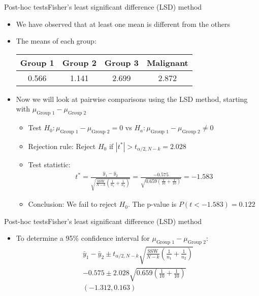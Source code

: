 \documentclass[xcolor=dvipsnames]{beamer}
\begin{document}
\begin{frame}{Post-hoc tests}{Fisher's least significant difference (LSD) method}
	\begin{itemize}
		\item We have observed that at least one mean is different from the others
		\item The means of each group:
		\begin{center}
			\begin{tabular}{|c|c|c|c|}
				\hline 
				  Group 1 & Group 2 & Group 3 & Malignant \\ \hline \hline
				 0.566 & 1.141 & 2.699 &  2.872 \\ \hline
			\end{tabular}
		\end{center}
	\vspace{2mm}
		\item Now we will look at pairwise comparisons using the LSD method, starting with $\mu_{\text{Group 1}}-\mu_{\text{Group 2}}$
		\begin{itemize}
			\item Test $H_0: \mu_{\text{Group 1}}-\mu_{\text{Group 2}} =0$ vs $H_a: \mu_{\text{Group 1}}-\mu_{\text{Group 2}}\neq 0$
			\item Rejection rule: Reject $H_0$ if $|t^*| > t_{\alpha/2, N-k} = 2.028$
					\item Test statistic:
			\begin{gather*}
			t^* = \frac{\bar{y}_1 - \bar{y}_2}{\sqrt{\frac{\text{SSW}}{N-k} \left(\frac{1}{n_1}+\frac{1}{n_2}\right)}} = 
			\frac{-0.575}{\sqrt{0.659 \left(\frac{1}{10}+\frac{1}{10}\right)}} = -1.583
			\end{gather*}
			\item Conclusion: We fail to reject $H_0$. The p-value is $P(t < -1.583) = 0.122$
		\end{itemize}
	\end{itemize}
\end{frame}

\begin{frame}{Post-hoc tests}{Fisher's least significant difference (LSD) method}
	\begin{itemize}
		\item To determine a 95\% confidence interval for $\mu_{\text{Group 1}}-\mu_{\text{Group 2}}$:
		\begin{gather*}
		\bar{y}_1 - \bar{y}_2 \pm t_{\alpha / 2, N - k}{\sqrt{\frac{\text{SSW}}{N-k} \left(\frac{1}{n_1}+\frac{1}{n_2}\right)}} \\
		-0.575 \pm 2.028\sqrt{0.659 \left(\frac{1}{10}+\frac{1}{10}\right)} \\
		(-1.312,  0.163)
		\end{gather*}
	\end{itemize}
\end{frame}
\end{document}
